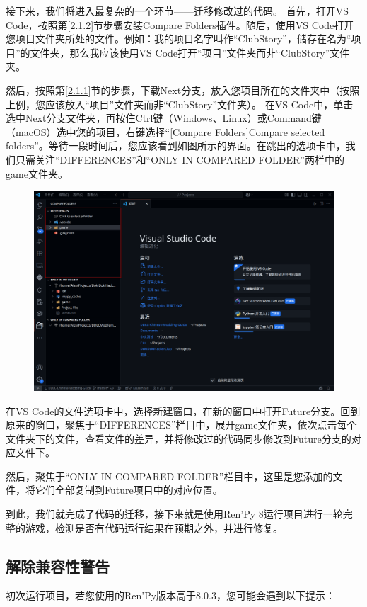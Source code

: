 接下来，我们将进入最复杂的一个环节——迁移修改过的代码。
首先，打开VS Code，按照第\ref{2.1.2}节步骤安装Compare Folders插件。随后，使用VS Code打开您项目文件夹所处的文件。例如：我的项目名字叫作“ClubStory”，储存在名为“项目”的文件夹，那么我应该使用VS Code打开“项目”文件夹而非“ClubStory”文件夹。

然后，按照第\ref{2.1.1}节的步骤，下载Next分支，放入您项目所在的文件夹中（按照上例，您应该放入“项目”文件夹而非“ClubStory”文件夹）。
在VS Code中，单击选中Next分支文件夹，再按住Ctrl键（Windows、Linux）或Command键（macOS）选中您的项目，右键选择“[Compare Folders]Compare selected folders”。等待一段时间后，您应该看到如图所示的界面。在跳出的选项卡中，我们只需关注“DIFFERENCES”和“ONLY IN COMPARED FOLDER”两栏中的game文件夹。
\begin{figure}[htbp]
    \centering
    \includegraphics[scale=.2]{Pictures/7.1.2.1.png}
\end{figure}

在VS Code的文件选项卡中，选择新建窗口，在新的窗口中打开Future分支。回到原来的窗口，聚焦于“DIFFERENCES”栏目中，展开game文件夹，依次点击每个文件夹下的文件，查看文件的差异，并将修改过的代码同步修改到Future分支的对应文件下。

然后，聚焦于“ONLY IN COMPARED FOLDER”栏目中，这里是您添加的文件，将它们全部复制到Future项目中的对应位置。

到此，我们就完成了代码的迁移，接下来就是使用Ren'Py 8运行项目进行一轮完整的游戏，检测是否有代码运行结果在预期之外，并进行修复。

\subsection{解除兼容性警告}
初次运行项目，若您使用的Ren'Py版本高于8.0.3，您可能会遇到以下提示：

